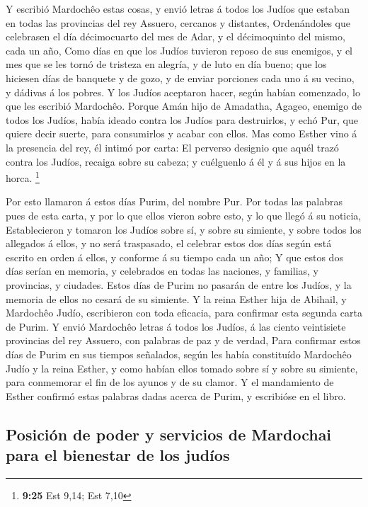  Y escribió Mardochêo estas cosas, y envió letras á todos
los Judíos que estaban en todas las provincias del rey Assuero, cercanos
y distantes,  Ordenándoles que celebrasen el día
décimocuarto del mes de Adar, y el décimoquinto del mismo, cada un año,
 Como días en que los Judíos tuvieron reposo de sus
enemigos, y el mes que se les tornó de tristeza en alegría, y de luto en
día bueno; que los hiciesen días de banquete y de gozo, y de enviar
porciones cada uno á su vecino, y dádivas á los pobres. 
Y los Judíos aceptaron hacer, según habían comenzado, lo que les
escribió Mardochêo.  Porque Amán hijo de Amadatha,
Agageo, enemigo de todos los Judíos, había ideado contra los Judíos para
destruirlos, y echó Pur, que quiere decir suerte, para consumirlos y
acabar con ellos.  Mas como Esther vino á la presencia
del rey, él intimó por carta: El perverso designio que aquél trazó
contra los Judíos, recaiga sobre su cabeza; y cuélguenlo á él y á sus
hijos en la horca. \footnote{\textbf{9:25} Est 9,14; Est 7,10}

 Por esto llamaron á estos días Purim, del nombre Pur.
Por todas las palabras pues de esta carta, y por lo que ellos vieron
sobre esto, y lo que llegó á su noticia,  Establecieron y
tomaron los Judíos sobre sí, y sobre su simiente, y sobre todos los
allegados á ellos, y no será traspasado, el celebrar estos dos días
según está escrito en orden á ellos, y conforme á su tiempo cada un año;
 Y que estos dos días serían en memoria, y celebrados en
todas las naciones, y familias, y provincias, y ciudades. Estos días de
Purim no pasarán de entre los Judíos, y la memoria de ellos no cesará de
su simiente.  Y la reina Esther hija de Abihail, y
Mardochêo Judío, escribieron con toda eficacia, para confirmar esta
segunda carta de Purim.  Y envió Mardochêo letras á todos
los Judíos, á las ciento veintisiete provincias del rey Assuero, con
palabras de paz y de verdad,  Para confirmar estos días
de Purim en sus tiempos señalados, según les había constituído Mardochêo
Judío y la reina Esther, y como habían ellos tomado sobre sí y sobre su
simiente, para conmemorar el fin de los ayunos y de su clamor.
 Y el mandamiento de Esther confirmó estas palabras dadas
acerca de Purim, y escribióse en el libro.

\hypertarget{posiciuxf3n-de-poder-y-servicios-de-mardochai-para-el-bienestar-de-los-juduxedos}{%
\subsection{Posición de poder y servicios de Mardochai para el bienestar
de los
judíos}\label{posiciuxf3n-de-poder-y-servicios-de-mardochai-para-el-bienestar-de-los-juduxedos}}

